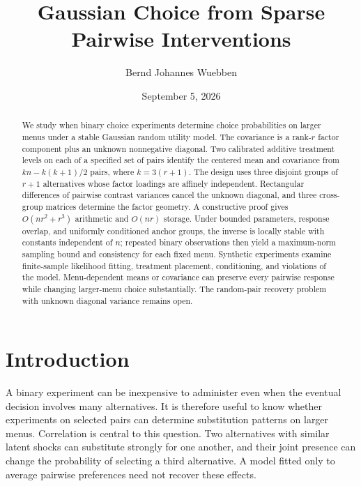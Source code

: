 \documentclass[11pt]{amsart}
\title[Gaussian Choice from Pairwise Interventions]{Gaussian Choice from Sparse Pairwise Interventions}
\author{Bernd Johannes Wuebben}
\date{September 5, 2026}
\theoremstyle{definition}\newtheorem{example}[theorem]{Example}
\theoremstyle{remark}\newtheorem{remark}[theorem]{Remark}
\begin{document}
\begin{abstract}
We study when binary choice experiments determine choice probabilities on larger menus under a stable Gaussian random utility model. The covariance is a rank-$r$ factor component plus an unknown nonnegative diagonal. Two calibrated additive treatment levels on each of a specified set of pairs identify the centered mean and covariance from $kn-k(k+1)/2$ pairs, where $k=3(r+1)$. The design uses three disjoint groups of $r+1$ alternatives whose factor loadings are affinely independent. Rectangular differences of pairwise contrast variances cancel the unknown diagonal, and three cross-group matrices determine the factor geometry. A constructive proof gives $O(nr^2+r^3)$ arithmetic and $O(nr)$ storage. Under bounded parameters, response overlap, and uniformly conditioned anchor groups, the inverse is locally stable with constants independent of $n$; repeated binary observations then yield a maximum-norm sampling bound and consistency for each fixed menu. Synthetic experiments examine finite-sample likelihood fitting, treatment placement, conditioning, and violations of the model. Menu-dependent means or covariance can preserve every pairwise response while changing larger-menu choice substantially. The random-pair recovery problem with unknown diagonal variance remains open.
\end{abstract}
\maketitle

\section{Introduction}
A binary experiment can be inexpensive to administer even when the eventual decision involves many alternatives. It is therefore useful to know whether experiments on selected pairs can determine substitution patterns on larger menus. Correlation is central to this question. Two alternatives with similar latent shocks can substitute strongly for one another, and their joint presence can change the probability of selecting a third alternative. A model fitted only to average pairwise preferences need not recover these effects.
\end{document}
